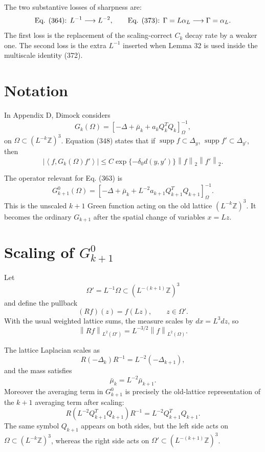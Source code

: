 \documentclass[11pt]{article}
\newcommand{\Z}{\mathbb Z}
\newcommand{\supp}{\operatorname{supp}}
\newcommand{\ip}[2]{\left\langle #1,#2\right\rangle}
\newcommand{\norm}[1]{\left\|#1\right\|}
\begin{document}
The two substantive losses of sharpness are:
\[
  \hbox{Eq. (364): } L^{-1}\longrightarrow L^{-2},
  \qquad
  \hbox{Eq. (373): } \Gamma=L\alpha_L\longrightarrow \Gamma=\alpha_L.
\]
The first loss is the replacement of the scaling-correct \(C_k\) decay rate by a
weaker one.  The second loss is the extra \(L^{-1}\) inserted when Lemma 32 is
used inside the multiscale identity (372).

\section*{Notation}

In Appendix D, Dimock considers
\begin{equation}
  G_k(\Omega)
  =
  \left[-\Delta+\bar\mu_k+a_k Q_k^TQ_k\right]_{\Omega}^{-1},
  \tag{340}
\end{equation}
on \(\Omega\subset (L^{-k}\Z)^3\).  Equation (348) states that if
\(\supp f\subset \Delta_y\), \(\supp f'\subset \Delta_{y'}\), then
\begin{equation}
  |\ip{f}{G_k(\Omega)f'}|
  \le C\exp\{-\delta_0d(y,y')\}\norm{f}_2\norm{f'}_2.
  \tag{348}
\end{equation}

The operator relevant for Eq. (363) is
\begin{equation}
  G^0_{k+1}(\Omega)
  =
  \left[
    -\Delta+\bar\mu_k+L^{-2}a_{k+1}Q_{k+1}^TQ_{k+1}
  \right]_{\Omega}^{-1}.
  \tag{362}
\end{equation}
This is the unscaled \(k+1\) Green function acting on the old lattice
\((L^{-k}\Z)^3\).  It becomes the ordinary \(G_{k+1}\) after the spatial change of
variables \(x=Lz\).

\section*{Scaling of \(G^0_{k+1}\)}

Let
\[
  \Omega' = L^{-1}\Omega \subset (L^{-(k+1)}\Z)^3
\]
and define the pullback
\[
  (Rf)(z)=f(Lz), \qquad z\in \Omega'.
\]
With the usual weighted lattice sums, the measure scales by \(dx=L^3dz\), so
\begin{equation}
  \norm{Rf}_{L^2(\Omega')}=L^{-3/2}\norm{f}_{L^2(\Omega)}.
  \label{eq:norm-scale}
\end{equation}

The lattice Laplacian scales as
\begin{equation}
  R(-\Delta_k)R^{-1}=L^{-2}(-\Delta_{k+1}),
  \label{eq:lap-scale}
\end{equation}
and the mass satisfies
\begin{equation}
  \bar\mu_k=L^{-2}\bar\mu_{k+1}.
  \label{eq:mass-scale}
\end{equation}
Moreover the averaging term in \(G^0_{k+1}\) is precisely the old-lattice
representation of the \(k+1\) averaging term after scaling:
\begin{equation}
  R\left(L^{-2}Q_{k+1}^TQ_{k+1}\right)R^{-1}
  =
  L^{-2}Q_{k+1}^TQ_{k+1}.
  \label{eq:q-scale}
\end{equation}
The same symbol \(Q_{k+1}\) appears on both sides, but the left side acts on
\(\Omega\subset (L^{-k}\Z)^3\), whereas the right side acts on
\(\Omega'\subset (L^{-(k+1)}\Z)^3\).
\end{document}

